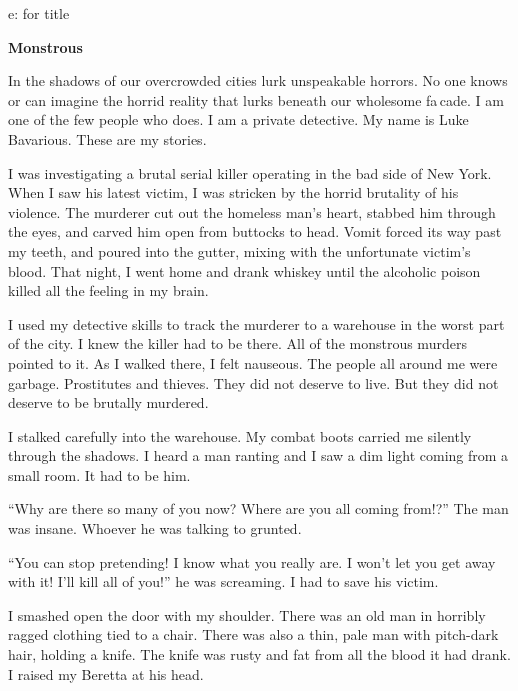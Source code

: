 e: for title 
 




{\bf Monstrous}



In the shadows of our overcrowded cities lurk unspeakable horrors.
No one knows or can imagine the horrid reality that lurks beneath
our wholesome fa\,cade. I am one of the few people who does. I
am a private detective. My name is Luke Bavarious. These are my
stories.



I was investigating a brutal serial killer operating in the bad
side of New York. When I saw his latest victim, I was stricken by
the horrid brutality of his violence. The murderer cut out the
homeless man's heart, stabbed him through the eyes, and
carved him open from buttocks to head. Vomit forced its way past my
teeth, and poured into the gutter, mixing with the unfortunate
victim's blood. That night, I went home and drank whiskey
until the alcoholic poison killed all the feeling in my
brain.



I used my detective skills to track the murderer to a warehouse in
the worst part of the city. I knew the killer had to be there. All
of the monstrous murders pointed to it. As I walked there, I felt
nauseous. The people all around me were garbage. Prostitutes and
thieves. They did not deserve to live. But they did not deserve to
be brutally murdered.



I stalked carefully into the warehouse. My combat boots carried me
silently through the shadows. I heard a man ranting and I saw a dim
light coming from a small room. It had to be him.



``Why are there so many of you now? Where are you all coming
from!?'' The man was insane. Whoever he was talking to
grunted.



``You can stop pretending! I know what you really are. I
won't let you get away with it! I'll kill all of
you!'' he was screaming. I had to save his victim.



I smashed open the door with my shoulder. There was an old man in
horribly ragged clothing tied to a chair. There was also a thin,
pale man with pitch-dark hair, holding a knife. The knife was rusty
and fat from all the blood it had drank. I raised my Beretta at his
head.



